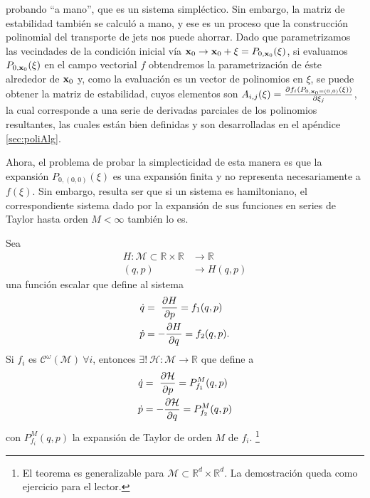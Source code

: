 probando ``a mano'', que es un sistema simpléctico. Sin embargo, la matriz de estabilidad también se calculó a mano, y ese es un proceso que la construcción polinomial del transporte de jets nos puede ahorrar. Dado que parametrizamos las vecindades de la condición inicial vía $\mathbf{x}_0 \to \mathbf{x}_0 + \xi = P_{0,\mathbf{x}_0}(\xi)$, si evaluamos $P_{0,\mathbf{x}_0}(\xi)$ en el campo vectorial $f$ obtendremos la parametrización de éste alrededor de $\mathbf{x}_0$ y, como la evaluación es un vector de polinomios en $\xi$, se puede obtener la matriz de estabilidad, cuyos elementos son $A_{i,j}(\xi) = \frac{\partial f_i(P_{0,\mathbf{x}_0=(0,0)}(\xi))}{\partial \xi_j}$, la cual corresponde a una serie de derivadas parciales de los polinomios resultantes, las cuales están bien definidas y son desarrolladas en el apéndice \ref{sec:poliAlg}.

Ahora, el problema de probar la simplecticidad de esta manera es que la expansión $P_{0,(0,0)}(\xi)$ es una expansión finita y no representa necesariamente a $f(\xi)$. Sin embargo, resulta ser que si un sistema es hamiltoniano, el correspondiente sistema dado por la expansión de sus funciones en series de Taylor hasta orden $M < \infty$ también lo es.

\begin{teorema}
Sea 
\begin{align*}
  H: \mathcal{M} \subset \mathbb{R} \times\mathbb{R} &\to \mathbb{R} \\ 
  (q,p) &\to H(q,p)
\end{align*}
una función escalar que define al sistema
\begin{align}
 \dot{q} &= \ \frac{\partial H}{\partial p} = f_1(q,p) \nonumber \\
 \dot{p} &= - \frac{\partial H}{\partial q} = f_2(q,p).
 \label{eq:theorem_ode}
\end{align}
Si $f_i$ es $\mathcal{C}^\omega(\mathcal{M}) \ \forall i$, entonces $\exists! \  \mathcal{H}: \mathcal{M} \to \mathbb{R}$ que define a
\begin{align*}
 \dot{q} &= \ \frac{\partial \mathcal{H}}{\partial p} = P_{f_1}^M(q,p) \\
 \dot{p} &= - \frac{\partial \mathcal{H}}{\partial q} = P_{f_2}^M(q,p)
\end{align*}
con $P_{f_i}^M(q,p)$ la expansión de Taylor de orden $M$ de $f_i$.
\footnote{El teorema es generalizable para $\mathcal{M} \subset \mathbb{R}^d \times \mathbb{R}^d$. La demostración queda como ejercicio para el lector.}
\end{teorema}

